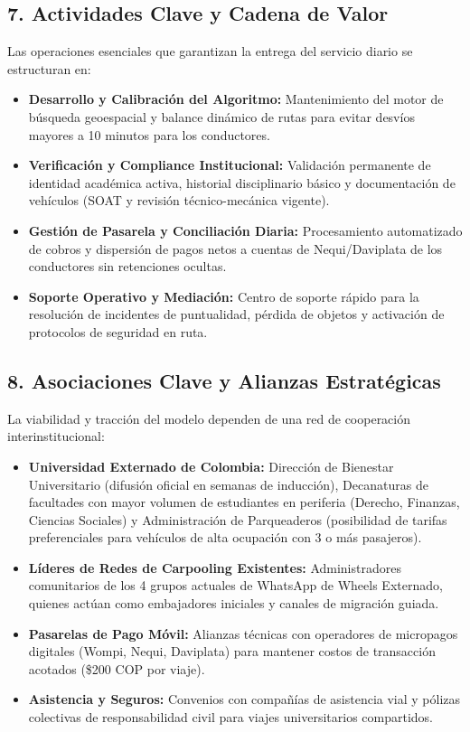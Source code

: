 \documentclass[11pt,a4paper]{article}
\begin{document}
\subsection{7. Actividades Clave y Cadena de Valor}
Las operaciones esenciales que garantizan la entrega del servicio diario se estructuran en:
\begin{itemize}[leftmargin=*]
    \item \textbf{Desarrollo y Calibraci\'on del Algoritmo:} Mantenimiento del motor de b\'usqueda geoespacial y balance din\'amico de rutas para evitar desv\'ios mayores a 10 minutos para los conductores.
    \item \textbf{Verificaci\'on y Compliance Institucional:} Validaci\'on permanente de identidad acad\'emica activa, historial disciplinario b\'asico y documentaci\'on de veh\'iculos (SOAT y revisi\'on t\'ecnico-mec\'anica vigente).
    \item \textbf{Gesti\'on de Pasarela y Conciliaci\'on Diaria:} Procesamiento automatizado de cobros y dispersi\'on de pagos netos a cuentas de Nequi/Daviplata de los conductores sin retenciones ocultas.
    \item \textbf{Soporte Operativo y Mediaci\'on:} Centro de soporte r\'apido para la resoluci\'on de incidentes de puntualidad, p\'erdida de objetos y activaci\'on de protocolos de seguridad en ruta.
\end{itemize}

\subsection{8. Asociaciones Clave y Alianzas Estrat\'egicas}
La viabilidad y tracci\'on del modelo dependen de una red de cooperaci\'on interinstitucional:
\begin{itemize}[leftmargin=*]
    \item \textbf{Universidad Externado de Colombia:} Direcci\'on de Bienestar Universitario (difusi\'on oficial en semanas de inducci\'on), Decanaturas de facultades con mayor volumen de estudiantes en periferia (Derecho, Finanzas, Ciencias Sociales) y Administraci\'on de Parqueaderos (posibilidad de tarifas preferenciales para veh\'iculos de alta ocupaci\'on con 3 o m\'as pasajeros).
    \item \textbf{L\'ideres de Redes de Carpooling Existentes:} Administradores comunitarios de los 4 grupos actuales de WhatsApp de Wheels Externado, quienes act\'uan como embajadores iniciales y canales de migraci\'on guiada.
    \item \textbf{Pasarelas de Pago M\'ovil:} Alianzas t\'ecnicas con operadores de micropagos digitales (Wompi, Nequi, Daviplata) para mantener costos de transacci\'on acotados (\$200 COP por viaje).
    \item \textbf{Asistencia y Seguros:} Convenios con compa\~n\'ias de asistencia vial y p\'olizas colectivas de responsabilidad civil para viajes universitarios compartidos.
\end{itemize}
\end{document}
